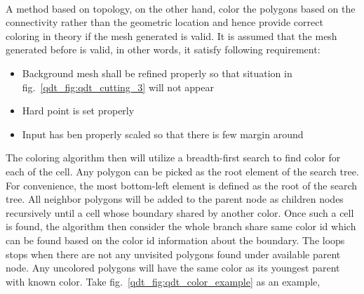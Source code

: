 \paragraph{}
A method based on topology, on the other hand, color the polygons based on the connectivity rather than the geometric location and hence provide correct coloring in theory if the mesh generated is valid.
It is assumed that the mesh generated before is valid, in other words, it satisfy following requirement:
    \begin{itemize}
        \item Background mesh shall be refined properly so that situation in fig.~\ref{qdt_fig:qdt_cutting_3} will not appear
        \item Hard point is set properly
        \item Input has ben properly scaled so that there is few margin around
    \end{itemize}
The coloring algorithm then will utilize a breadth-first search to find color for each of the cell.
Any polygon can be picked as the root element of the search tree.
For convenience, the most bottom-left element is defined as the root of the search tree.
All neighbor polygons will be added to the parent node as children nodes recursively until a cell whose boundary shared by another color.
Once such a cell is found, the algorithm then consider the whole branch share same color id which can be found based on the color id information about the boundary.
The loops stops when there are not any unvisited polygons found under available parent node. 
Any uncolored polygons will have the same color as its youngest parent with known color.
Take fig.~\ref{qdt_fig:qdt_color_example} as an example,

